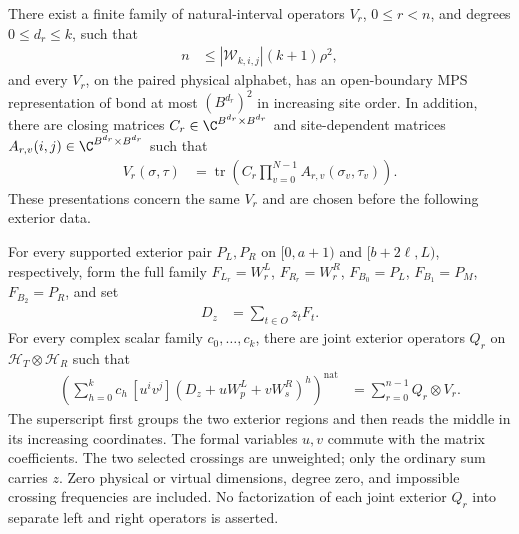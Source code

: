 \begin{lemma}
    There exist a finite family of natural-interval operators $V_r$,
    $0\le r<n$, and degrees $0\le d_r\le k$, such that
    \begin{align}
        n & \le |\mathcal W_{k,i,j}|(k+1)\rho^2,
        \label{eq:selected_common_natural_count}
    \end{align}
    and every $V_r$, on the paired physical alphabet, has an open-boundary
    MPS representation of bond at most $(B^{d_r})^2$ in increasing site order.
    In addition, there are closing matrices
    $C_r\in\C^{B^{d_r}\times B^{d_r}}$ and site-dependent matrices
    $A_{r,v}(i,j)\in\C^{B^{d_r}\times B^{d_r}}$ such that
    \begin{align}
        V_r(\sigma,\tau) & =\operatorname{tr}\left(C_r
        \prod_{v=0}^{N-1}A_{r,v}(\sigma_v,\tau_v)\right).
        \label{eq:selected_common_natural_trace}
    \end{align}
    These presentations concern the same $V_r$ and are chosen before the
    following exterior data.

    For every supported exterior pair $P_L,P_R$ on $[0,a+1)$ and
    $[b+2\ell,L)$, respectively, form the full family
    $F_{L_r}=W^L_r$, $F_{R_r}=W^R_r$,
    $F_{B_0}=P_L$, $F_{B_1}=P_M$, $F_{B_2}=P_R$, and set
    \begin{align}
        D_z & =\sum_{t\in O}z_tF_t.
        \label{eq:selected_common_natural_ordinary}
    \end{align}
    For every complex scalar family $c_0,\ldots,c_k$, there are joint exterior
    operators $Q_r$ on $\mathcal H_T\otimes\mathcal H_R$ such that
    \begin{align}
        \left(\sum_{h=0}^k c_h\,[u^iv^j]
        (D_z+uW^L_p+vW^R_s)^h\right)^{\mathrm{nat}}
         & =\sum_{r=0}^{n-1}Q_r\otimes V_r.
        \label{eq:selected_common_natural_decomposition}
    \end{align}
    The superscript first groups the two exterior regions and then reads the
    middle in its increasing coordinates. The formal variables $u,v$ commute
    with the matrix coefficients. The two selected crossings are unweighted;
    only the ordinary sum carries $z$.
    Zero physical or virtual dimensions, degree zero, and impossible crossing
    frequencies are included. No factorization of each joint exterior $Q_r$
    into separate left and right operators is asserted.
\end{lemma}
